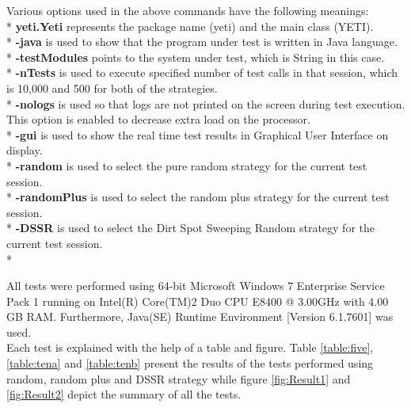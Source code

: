 Various options used in the above commands have the following meanings:\\*
\textbf{yeti.Yeti} represents the package name (yeti) and the main class (YETI).\\*
\textbf{-java} is used to show that the program under test is written in Java language.\\*
\textbf{-testModules} points to the system under test, which is String in this case.\\*
\textbf{-nTests} is used to execute specified number of test calls in that session, which is 10,000 and 500 for both of the strategies.\\*
\textbf{-nologs} is used so that logs are not printed on the screen during test execution. This option is enabled to decrease extra load on the processor.\\*
\textbf{-gui} is used to show the real time test results in Graphical User Interface on display.\\*
\textbf{-random} is used to select the pure random strategy for the current test session.\\*
\textbf{-randomPlus} is used to select the random plus strategy for the current test session.\\*
\textbf{-DSSR} is used to select the Dirt Spot Sweeping Random strategy for the current test session.\\*

All tests were performed using 64-bit Microsoft Windows 7 Enterprise Service Pack 1 running on Intel(R) Core(TM)2 Duo CPU E8400 @ 3.00GHz with 4.00 GB RAM. Furthermore, Java(SE) Runtime Environment [Version 6.1.7601] was used.\\

Each test is explained with the help of a table and figure. Table \ref{table:five}, \ref{table:tena} and \ref{table:tenb} present the results of the tests performed using random, random plus and DSSR strategy while figure \ref{fig:Result1} and \ref{fig:Result2} depict the summary of all the tests.



